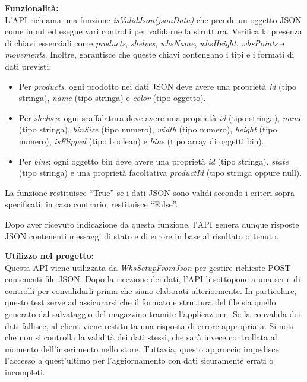 \bigskip
\noindent \textbf{Funzionalità:}\\
L'API richiama una funzione \textit{isValidJson(jsonData)} che prende un oggetto JSON come input ed esegue vari controlli per validarne la struttura. Verifica la presenza di chiavi essenziali come \textit{products}, \textit{shelves}, \textit{whsName}, \textit{whsHeight}, \textit{whsPoints} e \textit{movements}. Inoltre, garantisce che queste chiavi contengano i tipi e i formati di dati previsti:
\begin{itemize}
    \item Per \textit{products}, ogni prodotto nei dati JSON deve avere una proprietà \textit{id} (tipo stringa), \textit{name} (tipo stringa) e \textit{color} (tipo oggetto).
    \item Per \textit{shelves}: ogni scaffalatura deve avere una proprietà \textit{id} (tipo stringa), \textit{name} (tipo stringa), \textit{binSize} (tipo numero), \textit{width} (tipo numero), \textit{height} (tipo numero), \textit{isFlipped} (tipo boolean) e \textit{bins} (tipo array di oggetti bin).
    \item Per \textit{bins}: ogni oggetto bin deve avere una proprietà \textit{id} (tipo stringa), \textit{state} (tipo stringa) e una proprietà facoltativa \textit{productId} (tipo stringa oppure null).
\end{itemize}
La funzione restituisce ``True'' se i dati JSON sono validi secondo i criteri sopra specificati; in caso contrario, restituisce ``False''.

\noindent Dopo aver ricevuto indicazione da questa funzione, l'API genera dunque risposte JSON contenenti messaggi di stato e di errore in base al risultato ottenuto.

\bigskip
\noindent \textbf{Utilizzo nel progetto:}\\
Questa API viene utilizzata da \textit{WhsSetupFromJson} per gestire richieste POST contenenti file JSON. Dopo la ricezione dei dati, l'API li sottopone a una serie di controlli per convalidarli prima che siano elaborati ulteriormente. In particolare, questo test serve ad assicurarsi che il formato e struttura del file sia quello generato dal salvataggio del magazzino tramite l'applicazione. Se la convalida dei dati fallisce, al client viene restituita una risposta di errore appropriata. Si noti che non si controlla la validità dei dati stessi, che sarà invece controllata al momento dell'inserimento nello store. Tuttavia, questo approccio impedisce l'accesso a quest'ultimo per l'aggiornamento con dati sicuramente errati o incompleti.

